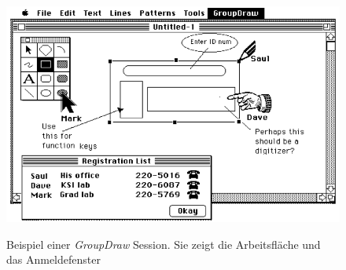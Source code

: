 \begin{figure}
        {\includegraphics[width=1\linewidth]{gfx/greenbergGroupDraw}}
		\caption[GroupDraw]{Beispiel einer \emph{GroupDraw} Session. Sie zeigt die Arbeitsfläche und das Anmeldefenster}\label{fig:greenbergGroupDraw}
\end{figure}

